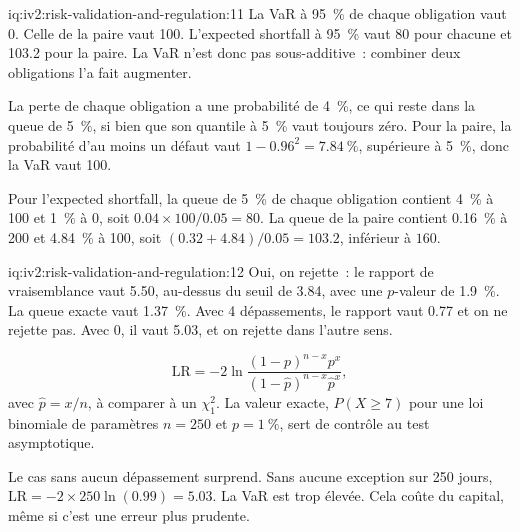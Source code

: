 \begin{solution}{iq:iv2:risk-validation-and-regulation:11}
La VaR à 95~\% de chaque obligation vaut 0. Celle de la paire vaut 100. L'expected shortfall à 95~\% vaut 80 pour chacune et 103.2 pour la paire. La VaR n'est donc pas sous-additive~: combiner deux obligations l'a fait augmenter.

La perte de chaque obligation a une probabilité de 4~\%, ce qui reste dans la queue de 5~\%, si bien que son quantile à 5~\% vaut toujours zéro. Pour la paire, la probabilité d'au moins un défaut vaut $1 - 0.96^2 = 7.84~\%$, supérieure à 5~\%, donc la VaR vaut 100.

Pour l'expected shortfall, la queue de 5~\% de chaque obligation contient 4~\% à 100 et 1~\% à 0, soit $0.04 \times 100/0.05 = 80$. La queue de la paire contient 0.16~\% à 200 et 4.84~\% à 100, soit $(0.32 + 4.84)/0.05 = 103.2$, inférieur à $160$.

\end{solution}

\begin{solution}{iq:iv2:risk-validation-and-regulation:12}
Oui, on rejette~: le rapport de vraisemblance vaut 5.50, au-dessus du seuil de 3.84, avec une $p$-valeur de 1.9~\%. La queue exacte vaut 1.37~\%. Avec 4 dépassements, le rapport vaut 0.77 et on ne rejette pas. Avec 0, il vaut 5.03, et on rejette dans l'autre sens.

\[
\mathrm{LR} = -2\ln\frac{(1 - p)^{n - x}p^{x}}{(1 - \hat p)^{n - x}\hat p^{x}},
\]
avec $\hat p = x/n$, à comparer à un $\chi^2_1$. La valeur exacte, $P(X \ge 7)$ pour une loi binomiale de paramètres $n = 250$ et $p = 1~\%$, sert de contrôle au test asymptotique.

Le cas sans aucun dépassement surprend. Sans aucune exception sur 250 jours, $\mathrm{LR} = -2 \times 250\ln(0.99) = 5.03$. La VaR est trop élevée. Cela coûte du capital, même si c'est une erreur plus prudente.

\end{solution}

